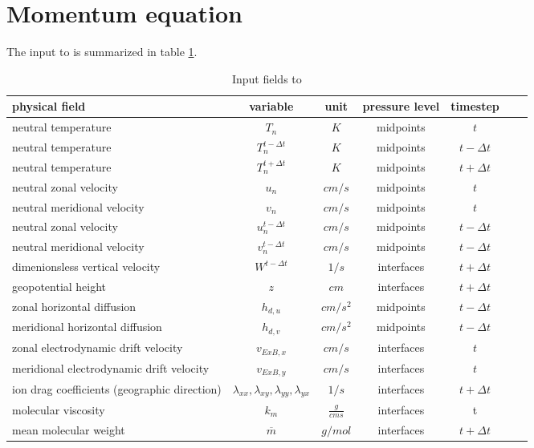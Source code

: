 %
\section{Momentum equation  }\label{cap:duv}
%
The input to  is summarized in table
\ref{tab:input_duv}.
%
\begin{table}[tb]
\begin{tabular}{|p{3.5cm} ||c|c|c|c|c|c|} \hline
physical field               & variable        & unit&pressure
level& timestep
\\ \hline \hline
%
neutral temperature &       $T_n$              & $K$   &  midpoints & $t$\\
neutral temperature &       $T_n^{t-\Delta t}$ & $K$   &  midpoints & $t-\Delta t$\\
neutral temperature &       $T_n^{t+\Delta t}$ & $K$   &  midpoints & $t+\Delta t$\\
neutral zonal velocity&     $u_n$     & $cm/s$   &  midpoints & $t$\\
neutral meridional velocity & $v_n$   & $cm/s$   &  midpoints & $t$\\
neutral zonal velocity&     {$u_n^{t-\Delta t}$} & $cm/s$& midpoints & $t-\Delta t$\\
neutral meridional velocity&{$v_n^{t-\Delta t}$} & $cm/s$& midpoints & $t-\Delta t$\\
dimenionsless vertical velocity& $W^{t-\Delta t}$& $1/s$   & interfaces& $t+\Delta t$ \\
geopotential height&  $z$     & $cm$   & interfaces  & $t+\Delta t$\\
zonal horizontal diffusion&       {$h_{d,u}$}     & $cm/s^2$   & midpoints  & $t-\Delta t$\\
meridional horizontal diffusion& {$h_{d,v}$}     & $cm/s^2$   & midpoints  & $t-\Delta t$ \\
zonal electrodynamic drift velocity&       {$v_{ExB,x}$}     & $cm/s$   & interfaces  & $t$ \\
meridional electrodynamic drift velocity&  {$v_{ExB,y}$}     & $cm/s$   & interfaces  & $t$ \\
ion drag coefficients (geographic direction)&       $\lambda_{xx},\lambda_{xy},\lambda_{yy},\lambda_{yx}$ & $1/s$   & interfaces  & $t + \Delta t$ \\
molecular viscosity&       $k_m$     & $\frac{g}{cm s}$   & interfaces  & t \\
mean molecular weight&       {$\overline{m}$}     & $g/mol$ &
interfaces  &$t + \Delta t$
 \\ \hline
\end{tabular}
\caption{Input fields to } \label{tab:input_duv}
\end{table}
